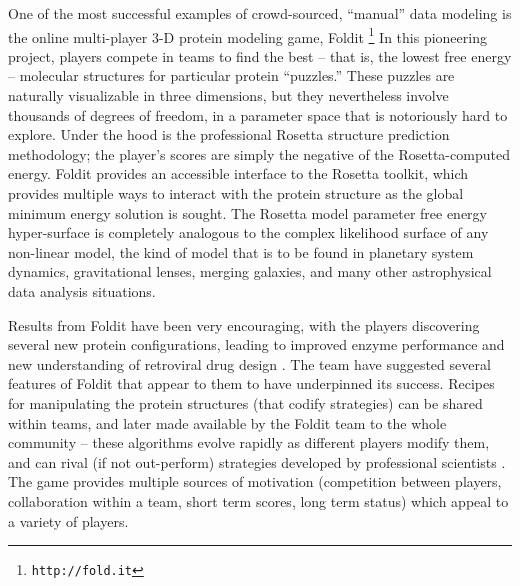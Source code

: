 \documentclass{ar2e}
\def\CaseStudy#1{\noindent{\it\bf #1 \,\,\,\,}}
\def\url#1{\texttt{#1}}
\begin{document}

\CaseStudy{Protein Modeling with Foldit}  
One of the most successful examples of crowd-sourced, ``manual'' data modeling is the
online multi-player 3-D protein modeling game,  Foldit
\citep{Cooper++2010}\footnote{\url{http://fold.it}} In this pioneering
project, players compete in teams to find the best -- that is, the lowest free energy --
molecular structures for particular protein ``puzzles.'' 
These puzzles are naturally visualizable in three dimensions, but 
they nevertheless involve thousands of degrees of freedom, in a parameter
space that is notoriously hard to explore.
Under the hood is the
professional Rosetta structure prediction methodology; the player's scores are
simply the negative of the Rosetta-computed energy. Foldit provides an
accessible interface to the Rosetta toolkit, which provides multiple ways to
interact with the protein structure as the global minimum energy solution is
sought. The Rosetta model parameter free energy hyper-surface is completely analogous
to the complex likelihood surface of any non-linear model, the kind of model
that is to be found in planetary system dynamics, gravitational lenses,
merging galaxies, and many other astrophysical data analysis situations. 

Results from Foldit have been very encouraging, with the players discovering
several new protein configurations, leading to improved enzyme performance 
\citep{Eiben++2012} and new understanding of retroviral drug design
\citep{Khatib++2011a}. The team have suggested several features of Foldit that
appear to them to have underpinned its success. Recipes for manipulating the
protein structures (that codify strategies) can be shared within teams, and
later made available by the Foldit team to the whole community -- these
algorithms evolve rapidly as different players modify them, and can rival (if
not out-perform) strategies developed by professional scientists 
\citep{Khatib++2011b}. The game provides multiple sources of motivation
(competition between players, collaboration within a team, short term scores,
long term status) which appeal to a variety of players. 


\end{document}
